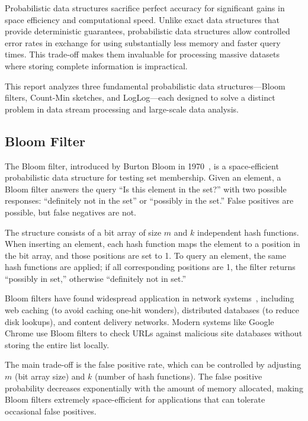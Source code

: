 Probabilistic data structures sacrifice perfect accuracy for significant gains in space efficiency and computational speed. Unlike exact data structures that provide deterministic guarantees, probabilistic data structures allow controlled error rates in exchange for using substantially less memory and faster query times. This trade-off makes them invaluable for processing massive datasets where storing complete information is impractical.

This report analyzes three fundamental probabilistic data structures---Bloom filters, Count-Min sketches, and LogLog---each designed to solve a distinct problem in data stream processing and large-scale data analysis.

\subsection{Bloom Filter}

The Bloom filter, introduced by Burton Bloom in 1970~\cite{bloom1970space}, is a space-efficient probabilistic data structure for testing set membership. Given an element, a Bloom filter answers the query ``Is this element in the set?'' with two possible responses: ``definitely not in the set'' or ``possibly in the set.'' False positives are possible, but false negatives are not.

The structure consists of a bit array of size $m$ and $k$ independent hash functions. When inserting an element, each hash function maps the element to a position in the bit array, and those positions are set to 1. To query an element, the same hash functions are applied; if all corresponding positions are 1, the filter returns ``possibly in set,'' otherwise ``definitely not in set.''

Bloom filters have found widespread application in network systems~\cite{broder2004network}, including web caching (to avoid caching one-hit wonders), distributed databases (to reduce disk lookups), and content delivery networks. Modern systems like Google Chrome use Bloom filters to check URLs against malicious site databases without storing the entire list locally.

The main trade-off is the false positive rate, which can be controlled by adjusting $m$ (bit array size) and $k$ (number of hash functions). The false positive probability decreases exponentially with the amount of memory allocated, making Bloom filters extremely space-efficient for applications that can tolerate occasional false positives.

